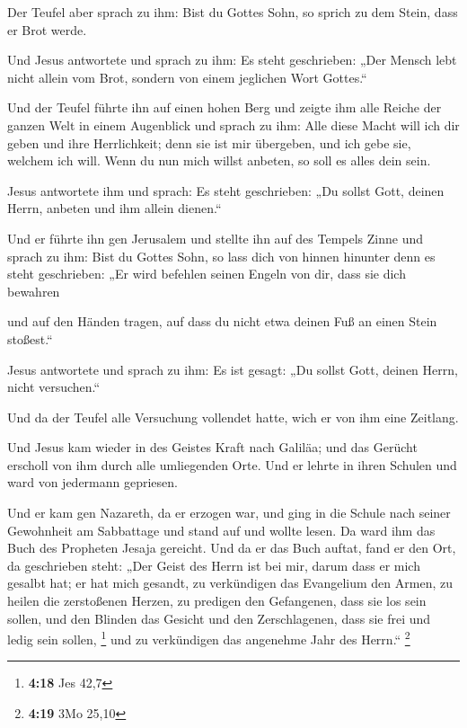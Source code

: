  Der Teufel aber sprach zu ihm: Bist du Gottes Sohn, so
sprich zu dem Stein, dass er Brot werde.

 Und Jesus antwortete und sprach zu ihm: Es steht
geschrieben: „Der Mensch lebt nicht allein vom Brot, sondern von einem
jeglichen Wort Gottes.``

 Und der Teufel führte ihn auf einen hohen Berg und zeigte
ihm alle Reiche der ganzen Welt in einem Augenblick  und
sprach zu ihm: Alle diese Macht will ich dir geben und ihre
Herrlichkeit; denn sie ist mir übergeben, und ich gebe sie, welchem ich
will.  Wenn du nun mich willst anbeten, so soll es alles
dein sein.

 Jesus antwortete ihm und sprach: Es steht geschrieben: „Du
sollst Gott, deinen Herrn, anbeten und ihm allein dienen.``

 Und er führte ihn gen Jerusalem und stellte ihn auf des
Tempels Zinne und sprach zu ihm: Bist du Gottes Sohn, so lass dich von
hinnen hinunter  denn es steht geschrieben: „Er wird
befehlen seinen Engeln von dir, dass sie dich bewahren

 und auf den Händen tragen, auf dass du nicht etwa deinen
Fuß an einen Stein stoßest.``

 Jesus antwortete und sprach zu ihm: Es ist gesagt: „Du
sollst Gott, deinen Herrn, nicht versuchen.``

 Und da der Teufel alle Versuchung vollendet hatte, wich er
von ihm eine Zeitlang.

 Und Jesus kam wieder in des Geistes Kraft nach Galiläa;
und das Gerücht erscholl von ihm durch alle umliegenden Orte.
 Und er lehrte in ihren Schulen und ward von jedermann
gepriesen.

 Und er kam gen Nazareth, da er erzogen war, und ging in
die Schule nach seiner Gewohnheit am Sabbattage und stand auf und wollte
lesen.  Da ward ihm das Buch des Propheten Jesaja gereicht.
Und da er das Buch auftat, fand er den Ort, da geschrieben steht:
 „Der Geist des Herrn ist bei mir, darum dass er mich
gesalbt hat; er hat mich gesandt, zu verkündigen das Evangelium den
Armen, zu heilen die zerstoßenen Herzen, zu predigen den Gefangenen,
dass sie los sein sollen, und den Blinden das Gesicht und den
Zerschlagenen, dass sie frei und ledig sein sollen, \footnote{\textbf{4:18}
  Jes 42,7}  und zu verkündigen das angenehme Jahr des
Herrn.`` \footnote{\textbf{4:19} 3Mo 25,10}

